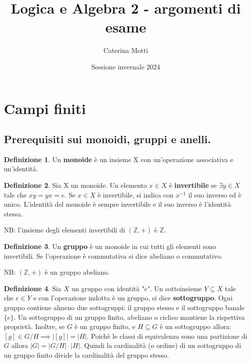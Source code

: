 \documentclass{article}
\title{Logica e Algebra 2 - argomenti di esame}
\author{Caterina Motti}
\date{Sessione invernale 2024}
\theoremstyle{definition}
\newtheorem{definizione}{Definizione}
\theoremstyle{plain}
\theoremstyle{plain}
\theoremstyle{plain}
\theoremstyle{plain}
\begin{document}
\maketitle
\tableofcontents
\clearpage

\section{Campi finiti}
\subsection{Prerequisiti sui monoidi, gruppi e anelli.}
\begin{definizione}
    Un \textbf{monoide} è un insieme X con un'operazione associativa e un'identità.
\end{definizione}
\begin{definizione}
    Sia X un monoide. Un elemento $x \in X$ è \textbf{invertibile} se $\exists y \in X$ tale che $xy = yx = e$. Se $x \in X$ è invertibile, si indica con $x^{-1}$ il suo inverso ed è unico. \newline
    L'identità del monoide è sempre invertibile e il suo inverso è l'identità stessa.
\end{definizione}
NB: l'insieme degli elementi invertibili di $(\mathbb{Z}, +)$ è $\mathbb{Z}$.
\begin{definizione}
    Un \textbf{gruppo} è un monoide in cui tutti gli elementi sono invertibili. Se l'operazione è commutativa si dice abeliano o commutativo.
\end{definizione}
NB: $(\mathbb{Z}, +)$ è un gruppo abeliano.
\begin{definizione}
    Sia $X$ un gruppo con identità "$e$". Un sottoinsieme $Y \subseteq X$ tale che $e \in Y$ e con l'operazione indotta è un gruppo, si dice \textbf{sottogruppo}. \newline
    Ogni gruppo contiene almeno due sottogruppi: il gruppo stesso e il sottogruppo banale $\{e\}$. \newline
    Un sottogruppo di un gruppo finito, abeliano o ciclico mantiene la rispettiva proprietà. 
    Inoltre, se $G$ è un gruppo finito, e $H \subseteq G$ è un sottogruppo allora: $[g] \in G/H \implies |[g]| = |H|$. Poichè le classi di equivalenza sono una partizione di $G$ allora $|G| = |G/H|\cdot|H|$. Quindi la cardinalità (o ordine) di un sottogruppo di un gruppo finito divide la cardinalità del gruppo stesso.
\end{definizione}
\end{document}
